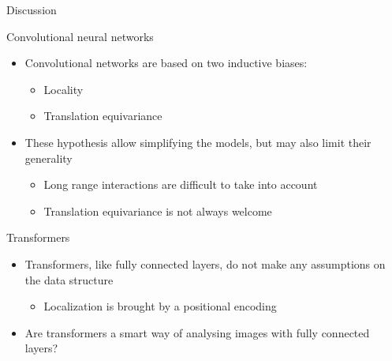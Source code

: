 \documentclass[xcolor=pdftex,dvipsnames,table,mathserif]{beamer}
\begin{document}
\begin{frame}{Discussion}

  \begin{block}{Convolutional neural networks}

    \begin{itemize}[<+->]
    \item Convolutional networks are based on two inductive biases:
      \begin{itemize}
      \item Locality
      \item Translation equivariance
      \end{itemize}

    \item These hypothesis allow simplifying the models, but may also limit their generality

      \begin{itemize}
      \item Long range interactions are difficult to take into account
      \item Translation equivariance is not always welcome

      \end{itemize}
    \end{itemize}

  \end{block}

  \begin{block}{Transformers}

    \begin{itemize}[<+->]
    \item Transformers, like fully connected layers, do not make any assumptions on the data structure
      \begin{itemize}
      \item Localization is brought by a positional encoding
      \end{itemize}

    \item Are transformers a smart way of analysing images with fully connected layers?

    \end{itemize}
  \end{block}


\end{frame}
\end{document}
